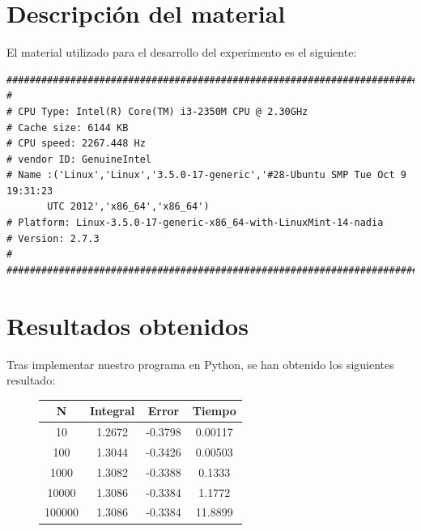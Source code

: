 \documentclass[spanish,a4paper,11pt]{report}
\begin{document}
\section{Descripción del material}   
\label{chapter:mat}

El material utilizado para el desarrollo del experimento es el siguiente:

\begin{center}
\begin{footnotesize}
\begin{verbatim}
##########################################################################
#
# CPU Type: Intel(R) Core(TM) i3-2350M CPU @ 2.30GHz
# Cache size: 6144 KB
# CPU speed: 2267.448 Hz
# vendor ID: GenuineIntel
# Name :('Linux','Linux','3.5.0-17-generic','#28-Ubuntu SMP Tue Oct 9 19:31:23 
	   UTC 2012','x86_64','x86_64')
# Platform: Linux-3.5.0-17-generic-x86_64-with-LinuxMint-14-nadia
# Version: 2.7.3
#   
##########################################################################
\end{verbatim}
\end{footnotesize}
\end{center}

\newpage

\section{Resultados obtenidos} 
\label{chapter:result}

Tras implementar nuestro programa en Python, se han obtenido los siguientes resultado:  \parindent=2cm

\begin{figure}[h]
\begin{center}
\begin{tabular}{||c|c c c||} 
 
 \hline
 \hline
 N & Integral & Error & Tiempo \\ 
 \hline
 10 & 1.2672 & -0.3798 & 0.00117 \\
 100 & 1.3044 & -0.3426 & 0.00503 \\
 1000 & 1.3082 & -0.3388 & 0.1333 \\
 10000 & 1.3086 & -0.3384 & 1.1772 \\
 100000 & 1.3086 & -0.3384 & 11.8899 \\
 \hline
 \hline
 
\end{tabular}
\end{center}
\end{figure}
\end{document}
